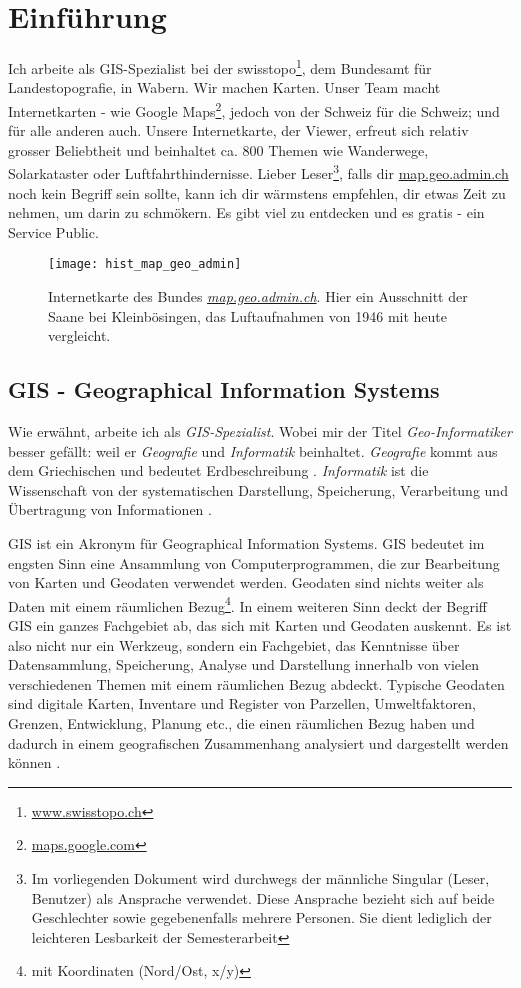 \section{Einführung}
Ich arbeite als GIS-Spezialist bei der swisstopo\footnote{\href{https://www.swisstopo.ch}{www.swisstopo.ch}}, dem Bundesamt für Landestopografie, in Wabern. Wir machen Karten. Unser Team macht Internetkarten - wie Google Maps\footnote{\href{https://maps.google.com}{maps.google.com}}, jedoch von der Schweiz für die Schweiz; und für alle anderen auch. Unsere Internetkarte, der Viewer, erfreut sich relativ grosser Beliebtheit
und beinhaltet ca. 800 Themen wie Wanderwege, Solarkataster oder Luftfahrthindernisse. Lieber Leser\footnote{Im vorliegenden Dokument wird durchwegs der männliche Singular (Leser, Benutzer) als Ansprache verwendet. Diese Ansprache bezieht sich auf beide Geschlechter sowie gegebenenfalls mehrere Personen. Sie dient lediglich der leichteren Lesbarkeit der Semesterarbeit}, falls dir \href{https://map.geo.admin.ch}{map.geo.admin.ch} noch kein Begriff sein sollte, kann ich dir wärmstens empfehlen, dir etwas Zeit zu nehmen, um darin zu schmökern. Es gibt viel zu entdecken und es gratis - ein Service Public.

\begin{figure}[H]
	\centering
	\texttt{[image: hist\_map\_geo\_admin]}
	\caption{Internetkarte des Bundes \emph{\href{https://s.geo.admin.ch/8a82499889}{map.geo.admin.ch}}. Hier ein Ausschnitt der Saane bei Kleinbösingen, das Luftaufnahmen von 1946 mit heute vergleicht.}
	\label{fig:map.geo.admin.ch}
\end{figure}


\subsection{GIS - Geographical Information Systems}
Wie erwähnt, arbeite ich als \emph{GIS-Spezialist}. Wobei mir der Titel \emph{Geo-Informatiker} besser gefällt: weil er \emph{Geografie} und \emph{Informatik} beinhaltet. \emph{Geografie} kommt aus dem Griechischen und bedeutet Erdbeschreibung \autocite[14]{Schertenleib2004}. \emph{Informatik} ist die Wissenschaft von der systematischen Darstellung, Speicherung, Verarbeitung und Übertragung von Informationen \cite{Informatik2010}.

GIS ist ein Akronym für Geographical Information Systems. GIS bedeutet im engsten Sinn eine Ansammlung von Computerprogrammen, die zur Bearbeitung von Karten und Geodaten verwendet werden. Geodaten sind nichts weiter als Daten mit einem räumlichen Bezug\footnote{mit Koordinaten (Nord/Ost, x/y)}. In einem weiteren Sinn deckt der Begriff GIS ein ganzes Fachgebiet ab, das sich mit Karten und Geodaten auskennt. Es ist also nicht nur ein Werkzeug, sondern ein Fachgebiet, das Kenntnisse über Datensammlung, Speicherung, Analyse und Darstellung innerhalb von vielen verschiedenen Themen mit einem räumlichen Bezug abdeckt. Typische Geodaten sind digitale Karten, Inventare und Register von Parzellen, Umweltfaktoren, Grenzen, Entwicklung, Planung etc., die einen räumlichen Bezug haben und dadurch in einem geografischen Zusammenhang analysiert und dargestellt werden können \autocite[15]{Balstroem}.

